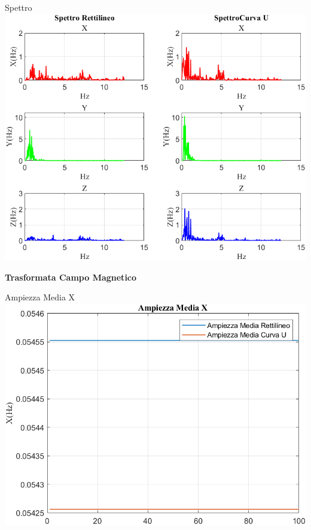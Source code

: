 \documentclass[beamer]{standalone}
\begin{document}
	\begin{frame}{{Spettro}}
		\centering\includegraphics[height=.8\textheight]{figure/Mag/Trasformata/Spettro}
	\end{frame}
	
	\begin{frame}
		\color{blue}\centering\huge{\textbf{Trasformata Campo Magnetico}}
	\end{frame}
	
	\begin{frame}{{Ampiezza Media X}}					
		\centering\includegraphics[height=.8\textheight]{figure/Mag/Trasformata/Ampiezza MediaX}
	\end{frame}
	
\end{document}
